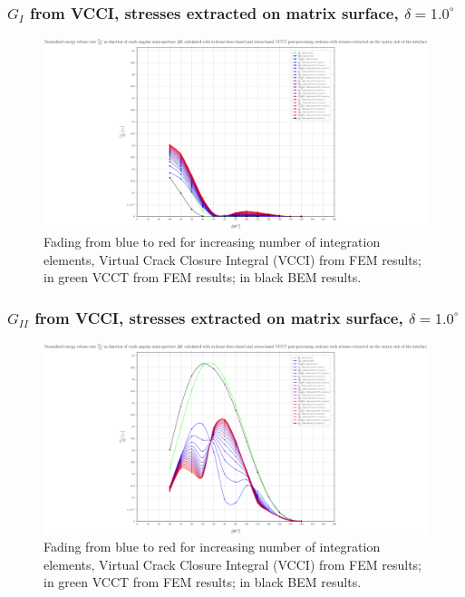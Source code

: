 \begin{frame}
\frametitle{\small $G_{I}$ from VCCI, stresses extracted on matrix surface, $\delta=1.0^{\circ}$}
\vspace{-0.5cm}
\centering
\captionsetup[figure]{font=scriptsize,labelfont=scriptsize}
\begin{figure}[!h]
\centering
\includegraphics[height=0.7\textheight]{2017-07-25_AbqRunSummary_SmallStrain_D10/pdf/2017-07-25_AbqRunSummary_SmallStrain_D10_F-SoM-VCCT_GI.pdf}
  \caption{\scriptsize Fading from blue to red for increasing number of integration elements, Virtual Crack Closure Integral (VCCI) from FEM results; in green VCCT from FEM results; in black BEM results.}
  \label{fig:res1}
\end{figure}
\end{frame}
\begin{frame}
\frametitle{\small $G_{II}$ from VCCI, stresses extracted on matrix surface, $\delta=1.0^{\circ}$}
\vspace{-0.5cm}
\centering
\captionsetup[figure]{font=scriptsize,labelfont=scriptsize}
\begin{figure}[!h]
\centering
\includegraphics[height=0.7\textheight]{2017-07-25_AbqRunSummary_SmallStrain_D10/pdf/2017-07-25_AbqRunSummary_SmallStrain_D10_F-SoM-VCCT_GII.pdf}
  \caption{\scriptsize Fading from blue to red for increasing number of integration elements, Virtual Crack Closure Integral (VCCI) from FEM results; in green VCCT from FEM results; in black BEM results.}
  \label{fig:res1}
\end{figure}
\end{frame}
